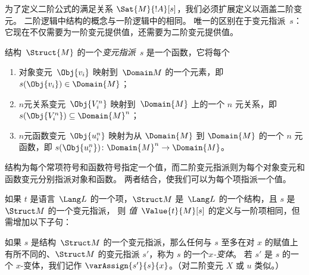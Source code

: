 \documentclass[../../../include/open-logic-section]{subfiles}
\begin{document}


\begin{explain}
为了定义二阶公式的满足关系 $\Sat{M}{!A}[s]$，我们必须扩展定义以涵盖二阶变元。
二阶逻辑中结构的概念与一阶逻辑中的相同。
唯一的区别在于变元指派~$s$：它现在不仅需要为一阶变元提供值，还需要为二阶变元提供值。
\end{explain}

\begin{defn}[变元指派]
结构~$\Struct{M}$ 的一个\emph{变元指派}~$s$ 是一个函数，它将每个
\begin{enumerate}
\item 对象变元~$\Obj{v_i}$ 映射到~$\Domain M$ 的一个元素，即 $s(\Obj{v_i}) \in \Domain{M}$；
\item $n$元关系变元~$\Obj{V_i^n}$ 映射到~$\Domain{M}$ 上的一个 $n$ 元关系，即 $s(\Obj{V_i^n}) \subseteq \Domain{M}^n$；
\item $n$元函数变元~$\Obj{u_i^n}$ 映射为从 $\Domain{M}$ 到 $\Domain{M}$ 的一个 $n$ 元函数，即 $s(\Obj{u_i^n})\colon \Domain{M}^n \to \Domain{M}$。
\end{enumerate}
\end{defn}

\begin{explain}
结构为每个常项符号和函数符号指定一个值，而二阶变元指派则为每个对象变元和函数变元分别指派对象和函数。
两者结合，使我们可以为每个项指派一个值。
\end{explain}

\begin{defn}[项的值]
如果 $t$ 是语言~$\Lang L$ 的一个项，$\Struct M$ 是~$\Lang L$ 的一个结构，且 $s$ 是~$\Struct M$ 的一个变元指派，
则 \emph{值}~$\Value{t}{M}[s]$ 的定义与一阶项相同，但需增加以下子句：
\begin{quote}
\end{quote}
\end{defn}

\begin{defn}[$x$-变体]
如果 $s$ 是结构~$\Struct M$ 的一个变元指派，那么任何与 $s$ 至多在对 $x$ 的赋值上有所不同的、$\Struct M$ 的变元指派 $s'$，称为 $s$ 的一个\emph{$x$-变体}。
若 $s'$ 是 $s$ 的一个 $x$-变体，我们记作 $\varAssign{s'}{s}{x}$。（对二阶变元 $X$ 或 $u$ 类似。）
\end{defn}
\end{document}
